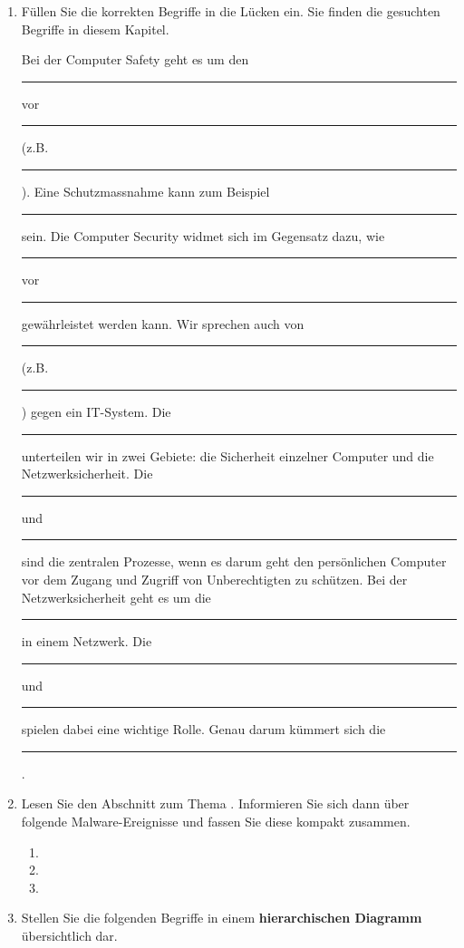 \begin{enumerate}

\item Füllen Sie die korrekten Begriffe in die Lücken ein. Sie finden die gesuchten Begriffe in diesem Kapitel.

\begin{spacing}{3.25}
\large
Bei der Computer Safety geht es um den \rule[-0.75mm]{6cm}{.5pt} vor \\ \rule[-0.75mm]{6cm}{.5pt} (z.B. \rule[-0.75mm]{4cm}{.5pt}). Eine Schutzmassnahme kann zum Beispiel \rule[-0.75mm]{6cm}{.5pt} sein. Die Computer Security widmet sich im Gegensatz dazu, wie \rule[-0.75mm]{6cm}{.5pt} vor \rule[-0.75mm]{6cm}{.5pt} gewährleistet werden kann. Wir sprechen auch von \rule[-0.75mm]{6cm}{.5pt} (z.B. \rule[-0.75mm]{6cm}{.5pt}) gegen ein \ac{IT}-System. Die \rule[-0.75mm]{6cm}{.5pt} unterteilen wir in zwei Gebiete: die Sicherheit einzelner Computer und die Netzwerksicherheit. Die \rule[-0.75mm]{6cm}{.5pt} und \rule[-0.75mm]{6cm}{.5pt} sind die zentralen Prozesse, wenn es darum geht den persönlichen Computer vor dem Zugang und Zugriff von Unberechtigten zu schützen. Bei der Netzwerksicherheit geht es um die \rule[-0.75mm]{6cm}{.5pt} in einem Netzwerk. Die \rule[-0.75mm]{4cm}{.5pt} und \rule[-0.75mm]{6cm}{.5pt} spielen dabei eine wichtige Rolle. Genau darum kümmert sich die \rule[-0.75mm]{6cm}{.5pt} .
\end{spacing}


\item Lesen Sie den Abschnitt zum Thema . Informieren Sie sich dann über folgende Malware-Ereignisse und fassen Sie diese kompakt zusammen.

\begin{enumerate}
\item {}

\fillwithgrid{1in}

\item {}

\fillwithgrid{1in}

\item {}

\fillwithgrid{1in}

\end{enumerate}

\item Stellen Sie die folgenden Begriffe in einem \textbf{hierarchischen Diagramm} übersichtlich dar.


\end{enumerate}

